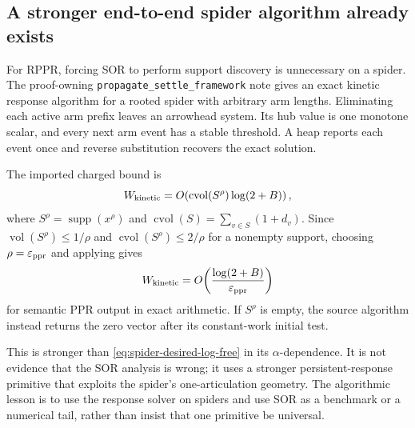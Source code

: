 \subsection{A stronger end-to-end spider algorithm already exists}

For RPPR, forcing SOR to perform support discovery is unnecessary on a
spider.  The proof-owning \texttt{propagate\_settle\_framework} note gives an
exact kinetic response algorithm for a rooted spider with arbitrary arm
lengths.  Eliminating each active arm prefix leaves an arrowhead system.  Its
hub value is one monotone scalar, and every next arm event has a stable
threshold.  A heap reports each event once and reverse substitution recovers
the exact solution.

The imported charged bound is
\begin{equation}
 W_{\rm kinetic}
 =O\!\left(\operatorname{cvol}(S^\rho)
            \log(2+B)\right),
 \label{eq:kinetic-spider-import}
\end{equation}
where $S^\rho=\operatorname{supp}(x^\rho)$ and
$\operatorname{cvol}(S)=\sum_{v\in S}(1+d_v)$.  Since
$\operatorname{vol}(S^\rho)\leq1/\rho$ and
$\operatorname{cvol}(S^\rho)\leq2/\rho$ for a nonempty support, choosing
$\rho=\varepsilon_{\rm ppr}$ and applying
 gives
\begin{equation}
 W_{\rm kinetic}
 =O\!\left(
  \frac{\log(2+B)}{\varepsilon_{\rm ppr}}
 \right)
 \label{eq:kinetic-spider-ppr-work}
\end{equation}
for semantic PPR output in exact arithmetic.
If $S^\rho$ is empty, the source algorithm instead returns the zero vector
after its constant-work initial test.

This is stronger than \eqref{eq:spider-desired-log-free} in its
$\alpha$-dependence.  It is not evidence that the SOR analysis is wrong; it
uses a stronger persistent-response primitive that exploits the spider's
one-articulation geometry.  The algorithmic lesson is to use the response
solver on spiders and use SOR as a benchmark or a numerical tail, rather than
insist that one primitive be universal.
